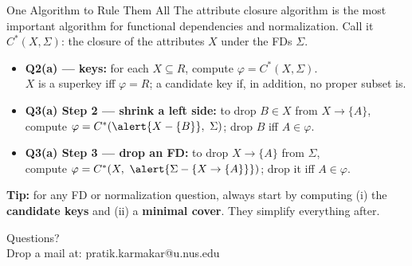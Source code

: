\documentclass{beamer}
\newcommand\Cstar{C^{*}}
\begin{document}
\begin{frame}{One Algorithm to Rule Them All}
\small
The \alert{attribute closure} algorithm is the most important algorithm for functional dependencies and normalization. Call it $\Cstar(X, \Sigma)$: the closure of the attributes $X$ under the FDs $\Sigma$.
\medskip

\begin{itemize}\itemsep4pt
  \item \textbf{Q2(a) --- keys:} for each $X \subseteq R$, compute $\varphi = \Cstar(X, \Sigma)$. \\
  $X$ is a superkey iff $\varphi = R$; a candidate key if, in addition, no proper subset is.
  \item \textbf{Q3(a) Step 2 --- shrink a left side:} to drop $B \in X$ from $X \rightarrow \{A\}$, \\
  compute $\varphi = \Cstar(\alert{X - \{B\}},\ \Sigma)$; drop $B$ iff $A \in \varphi$.
  \item \textbf{Q3(a) Step 3 --- drop an FD:} to drop $X \rightarrow \{A\}$ from $\Sigma$, \\
  compute $\varphi = \Cstar(X,\ \alert{\Sigma - \{X \rightarrow \{A\}\}})$; drop it iff $A \in \varphi$.
\end{itemize}
\medskip
\textbf{Tip:} for any FD or normalization question, always start by computing (i) the \textbf{candidate keys} and (ii) a \textbf{minimal cover}. They simplify everything after.
\end{frame}

\begin{frame}
\begin{center}
Questions?\\
Drop a mail at: pratik.karmakar@u.nus.edu
\end{center}
\end{frame}
\end{document}

